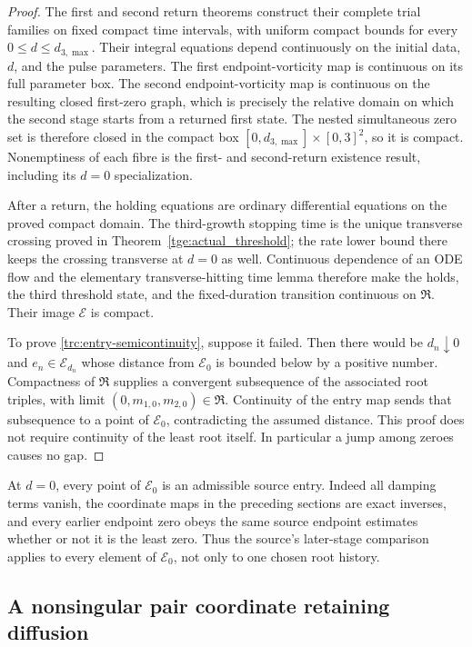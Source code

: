 \begin{proof}
The first and second return theorems construct their complete trial
families on fixed compact time intervals, with uniform compact bounds for
every $0\leq d\leq d_{3,\max}$.  Their integral equations depend
continuously on the initial data, $d$, and the pulse parameters.  The first
endpoint-vorticity map is continuous on its full parameter box.  The second
endpoint-vorticity map is continuous on the resulting closed first-zero
graph, which is precisely the relative domain on which the second stage
starts from a returned first state.  The nested simultaneous zero set is
therefore closed in the compact box
$[0,d_{3,\max}]\times[0,3]^2$, so it is compact.  Nonemptiness of each
fibre is the first- and second-return existence result, including its
$d=0$ specialization.

After a return, the holding equations are ordinary differential equations
on the proved compact domain.  The third-growth stopping time is the unique
transverse crossing proved in Theorem~\ref{tge:actual_threshold}; the rate
lower bound there keeps the crossing transverse at $d=0$ as well.
Continuous dependence of an ODE flow and the elementary transverse-hitting
time lemma therefore make the holds, the third threshold state, and the
fixed-duration transition continuous on $\mathfrak R$.  Their image
$\mathcal E$ is compact.

To prove \eqref{trc:entry-semicontinuity}, suppose it failed.  Then there
would be $d_n\downarrow0$ and $e_n\in\mathcal E_{d_n}$ whose distance from
$\mathcal E_0$ is bounded below by a positive number.  Compactness of
$\mathfrak R$ supplies a convergent subsequence of the associated root
triples, with limit $(0,m_{1,0},m_{2,0})\in\mathfrak R$.  Continuity of the
entry map sends that subsequence to a point of $\mathcal E_0$, contradicting
the assumed distance.  This proof does not require continuity of the least
root itself.  In particular a jump among zeroes causes no gap.
\end{proof}

At $d=0$, every point of $\mathcal E_0$ is an admissible source entry.
Indeed all damping terms vanish, the coordinate maps in the preceding
sections are exact inverses, and every earlier endpoint zero obeys the same
source endpoint estimates whether or not it is the least zero.  Thus the
source's later-stage comparison applies to every element of
$\mathcal E_0$, not only to one chosen root history.

\subsection{A nonsingular pair coordinate retaining diffusion}

